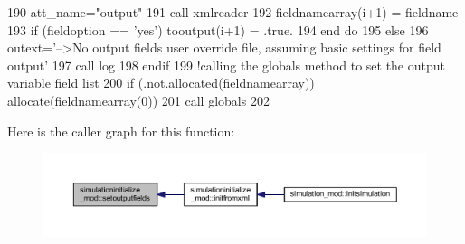 \begin{DoxyCode}
190             att\_name=\textcolor{stringliteral}{"output"}
191             \textcolor{keyword}{call }xmlreader%
192             fieldnamearray(i+1) = fieldname
193             \textcolor{keywordflow}{if} (fieldoption == \textcolor{stringliteral}{'yes'}) tooutput(i+1) = .true.
194 \textcolor{keywordflow}{        end do}
195     \textcolor{keywordflow}{else}
196         outext=\textcolor{stringliteral}{'-->No output fields user override file, assuming basic settings for field output'}
197         \textcolor{keyword}{call }log%
198 \textcolor{keywordflow}{    endif}
199     \textcolor{comment}{!calling the globals method to set the output variable field list}
200     \textcolor{keywordflow}{if} (.not.\textcolor{keyword}{allocated}(fieldnamearray)) \textcolor{keyword}{allocate}(fieldnamearray(0))
201     \textcolor{keyword}{call }globals%
202 
\end{DoxyCode}
Here is the caller graph for this function\+:\nopagebreak
\begin{figure}[H]
\begin{center}
\leavevmode
\includegraphics[width=350pt]{namespacesimulationinitialize__mod_a09174fb4527277943700a5509de326dd_icgraph}
\end{center}
\end{figure}
